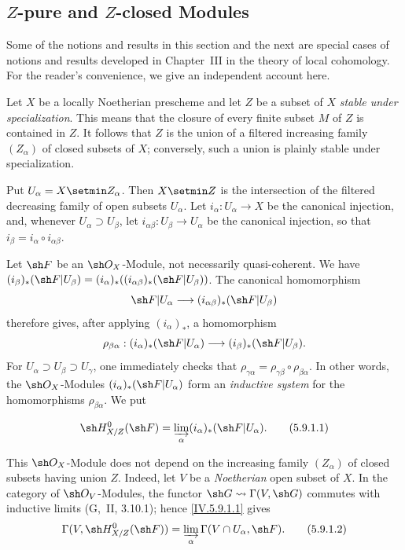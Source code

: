 \subsection{\texorpdfstring{$Z$}{Z}-pure and
\texorpdfstring{$Z$}{Z}-closed Modules}
\label{subsection:IV.5.9}

Some of the notions and results in this section and the next are
special cases of notions and results developed in Chapter~III in the
theory of local cohomology.  For the reader's convenience, we give an
independent account here.

\begin{env}[5.9.1]
\label{IV.5.9.1}
Let $X$ be a locally Noetherian prescheme and let $Z$ be a subset of
$X$ \emph{stable under specialization}.  This means that the closure
of every finite subset $M$ of $Z$ is contained in $Z$.  It follows
that $Z$ is the union of a filtered increasing family $(Z_\alpha)$ of
closed subsets of $X$; conversely, such a union is plainly stable
under specialization.

Put $U_\alpha=X\setmin Z_\alpha$.  Then $X\setmin Z$ is the intersection of the
filtered decreasing family of open subsets $U_\alpha$.  Let
$i_\alpha:U_\alpha\to X$ be the canonical injection, and, whenever
$U_\alpha\supset U_\beta$, let
$i_{\alpha\beta}:U_\beta\to U_\alpha$ be the canonical injection, so
that $i_\beta=i_\alpha\circ i_{\alpha\beta}$.

Let $\sh F$ be an $\sh O_X$-Module, not necessarily quasi-coherent.
We have $(i_\beta)_*(\sh F|U_\beta)
= (i_\alpha)_*((i_{\alpha\beta})_*(\sh F|U_\beta))$.
The canonical homomorphism 
\[
  \sh F|U_\alpha\longrightarrow
  (i_{\alpha\beta})_*(\sh F|U_\beta)
\]
therefore gives, after applying $(i_\alpha)_*$, a homomorphism
\[
 \rho_{\beta\alpha}:
 (i_\alpha)_*(\sh F|U_\alpha)\longrightarrow
 (i_\beta)_*(\sh F|U_\beta).
\]
For $U_\alpha\supset U_\beta\supset U_\gamma$, one immediately
checks that
$\rho_{\gamma\alpha}=\rho_{\gamma\beta}\circ\rho_{\beta\alpha}$.
In other words, the $\sh O_X$-Modules $(i_\alpha)_*(\sh F|U_\alpha)$ form an
\emph{inductive system} for the homomorphisms $\rho_{\beta\alpha}$.  We put
\end{env}

\begin{equation}
\label{IV.5.9.1.1}
 \sh H^0_{X/Z}(\sh F)
 =\varinjlim_\alpha(i_\alpha)_*(\sh F|U_\alpha).
\tag{5.9.1.1}
\end{equation}

This $\sh O_X$-Module does not depend on the increasing family
$(Z_\alpha)$ of closed subsets having union $Z$.  Indeed, let $V$ be
a \emph{Noetherian} open subset of $X$.  In the category of
$\sh O_V$-Modules, the functor
$\sh G\leadsto\Gamma(V,\sh G)$ commutes with inductive limits
(G,~II, 3.10.1); hence \eqref{IV.5.9.1.1} gives
\begin{equation}
\label{IV.5.9.1.2}
 \Gamma(V,\sh H^0_{X/Z}(\sh F))
 =\varinjlim_\alpha\Gamma(V\cap U_\alpha,\sh F).
\tag{5.9.1.2}
\end{equation}

